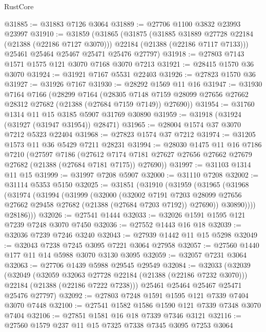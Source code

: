 \begin{lexlean}{RustCore}
\begin{coremodule}
@31885 := @31883 @7126 @3064
@31889 := @27706 @1100 @3832 @23993 @23997
@31910 := @31859
    (@31865
      (@31875
        (@31885 @31889 @27728 @22184 (@21388 (@22186 @7127 @3070)))
        @22184
        (@21388 (@22186 @7117 @7133)))
      @25461
      @25464
      @25467
      @25471
      @25476
      @27797)
@31918 := @27803 @7143 @1571 @1575 @121 @3070 @7168 @3070 @7213
@31921 := @28415 @1570 @36 @3070
@31924 := @31921 @7167 @5531 @22403
@31926 := @27823 @1570 @36
@31927 := @31926 @7167
@31930 := @28292 @1569 @11 @16
@31947 := @31930
    @7164
    @7166
    (@28299
      @7164
      (@28305 @7148 @7159 @28099 @27656 @27662 @28312 @27682 (@21388 (@27684 @7159 @7149)) @27690))
@31954 := @31760 @1314 @11 @15 @3185 @5907 @31769 @30890
@31959 := @31918 (@31924 (@31927 (@31947 @31954)) @28471)
@31965 := @28004 @1574 @37 @3070 @7212 @5323 @22404
@31968 := @27823 @1574 @37 @7212
@31974 := @31205 @1573 @11 @36 @5429 @7211 @28231
@31994 := @28030
    @1475
    @11
    @16
    @7186
    @7210
    (@27597
      @7186
      (@27612 @7174 @7181 @27627 @27656 @27662 @27679 @27682 (@21388 (@27684 @7181 @7175)) @27690))
@31997 := @31103 @1314 @11 @15
@31999 := @31997 @7208 @5907
@32000 := @31110 @7208
@32002 := @31114 @5353 @5150
@32025 := @31851
    (@31910
      (@31959
        (@31965
          (@31968
            (@31974
              (@31994
                (@31999
                  (@32000
                    (@32002
                      @7191
                      @7203
                      @28099
                      @27656
                      @27662
                      @29458
                      @27682
                      (@21388 (@27684 @7203 @7192))
                      @27690))
                  @30890))))
          @28186)))
@32026 := @27541 @1444
@32033 := @32026 @1591 @1595 @121 @7239 @7248 @3070 @7450
@32036 := @27552 @1443 @16 @18
@32039 := @32036 @7239 @7246 @3240
@32043 := @27939 @1442 @11 @15 @5298
@32049 := @32043 @7238 @7245 @3095 @7221 @3064 @27958
@32057 := @27560 @1440 @177 @11 @14 @5988 @3070 @3130 @3095
@32059 := @32057 @7231 @3064
@32063 := @27706 @1439 @5988 @29545 @29549
@32084 := @32033
    (@32039
      (@32049
        (@32059 @32063 @27728 @22184 (@21388 (@22186 @7232 @3070)))
        @22184
        (@21388 (@22186 @7222 @7238)))
      @25461
      @25464
      @25467
      @25471
      @25476
      @27797)
@32092 := @27803 @7248 @1591 @1595 @121 @7339 @7404 @3070 @7448
@32100 := @27541 @1582 @1586 @1590 @121 @7339 @7348 @3070 @7404
@32106 := @27851 @1581 @16 @18 @7339 @7346 @3121
@32116 := @27560 @1579 @237 @11 @15 @7325 @7338 @7345 @3095 @7253 @3064

\end{coremodule}
\end{lexlean}
